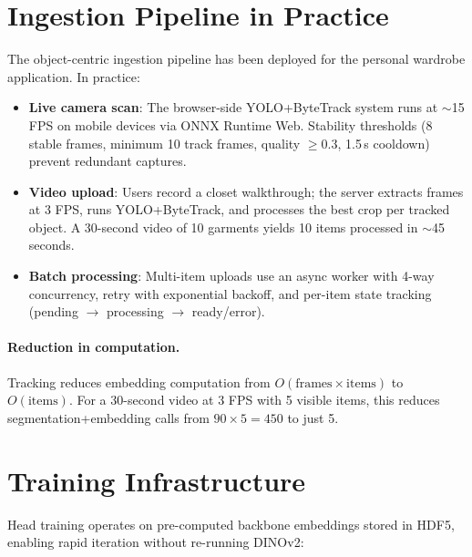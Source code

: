 \documentclass[10pt,twocolumn]{article}
\begin{document}
\section{Ingestion Pipeline in Practice}
\label{sec:ingestion_practice}

The object-centric ingestion pipeline has been deployed for the personal
wardrobe application.  In practice:

\begin{itemize}[leftmargin=*,topsep=2pt,itemsep=1pt]
\item \textbf{Live camera scan}: The browser-side YOLO+ByteTrack system
  runs at $\sim$15 FPS on mobile devices via ONNX Runtime Web.  Stability
  thresholds (8 stable frames, minimum 10 track frames, quality $\geq 0.3$,
  1.5\,s cooldown) prevent redundant captures.
\item \textbf{Video upload}: Users record a closet walkthrough; the server
  extracts frames at 3 FPS, runs YOLO+ByteTrack, and processes the best
  crop per tracked object.  A 30-second video of 10 garments yields 10
  items processed in $\sim$45 seconds.
\item \textbf{Batch processing}: Multi-item uploads use an async worker
  with 4-way concurrency, retry with exponential backoff, and per-item
  state tracking (pending $\to$ processing $\to$ ready/error).
\end{itemize}

\paragraph{Reduction in computation.}
Tracking reduces embedding computation from $O(\text{frames} \times
\text{items})$ to $O(\text{items})$.  For a 30-second video at 3 FPS with
5 visible items, this reduces segmentation+embedding calls from
$90 \times 5 = 450$ to just 5.

\section{Training Infrastructure}
\label{sec:training}

Head training operates on pre-computed backbone embeddings stored in HDF5,
enabling rapid iteration without re-running DINOv2:
\end{document}
